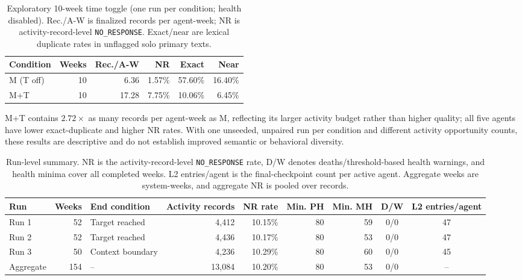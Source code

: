 \documentclass[11pt]{article}
\begin{document}
\begin{table}[!ht]
\centering
\caption{Exploratory 10-week time toggle (one run per condition; health disabled). Rec./A-W is finalized records per agent-week; NR is activity-record-level \texttt{NO\_RESPONSE}. Exact/near are lexical duplicate rates in unflagged solo primary texts.}
\label{tab:time}
{\small\setlength{\tabcolsep}{3pt}
\begin{tabular}{@{}lrrrrr@{}}
\toprule
Condition & Weeks & Rec./A-W & NR & Exact & Near \\
\midrule
M (T off) & 10 & 6.36 & 1.57\% & 57.60\% & 16.40\% \\
M+T       & 10 & 17.28 & 7.75\% & 10.06\% & 6.45\% \\
\bottomrule
\end{tabular}}
\end{table}

M+T contains $2.72\times$ as many records per agent-week as M, reflecting its larger activity budget rather than higher quality; all five agents have lower exact-duplicate and higher NR rates.
With one unseeded, unpaired run per condition and different activity opportunity counts, these results are descriptive and do not establish improved semantic or behavioral diversity.

\begin{table}[!t]
\centering
\small
\caption{Run-level summary. NR is the activity-record-level \texttt{NO\_RESPONSE} rate, D/W denotes deaths/threshold-based health warnings, and health minima cover all completed weeks. L2 entries/agent is the final-checkpoint count per active agent. Aggregate weeks are system-weeks, and aggregate NR is pooled over records.}
\label{tab:summary}
\begin{tabular}{@{}lrlrrrrcc@{}}
\toprule
Run & Weeks & End condition & Activity records & NR rate & Min. PH & Min. MH & D/W & L2 entries/agent \\
\midrule
Run 1 & 52 & Target reached   & 4,412 & 10.15\% & 80 & 59 & 0/0 & 47 \\
Run 2 & 52 & Target reached   & 4,436 & 10.17\% & 80 & 53 & 0/0 & 47 \\
Run 3 & 50 & Context boundary & 4,236 & 10.29\% & 80 & 60 & 0/0 & 45 \\
\midrule
Aggregate & 154 & -- & 13,084 & 10.20\% & 80 & 53 & 0/0 & -- \\
\bottomrule
\end{tabular}
\end{table}
\end{document}
